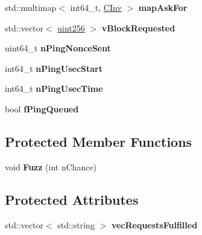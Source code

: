\begin{DoxyCompactItemize}
\item 
\mbox{\label{class_c_node_a7593dfbd76c34a81169e3fb2aa0e0cf7}} 
std\+::multimap$<$ int64\+\_\+t, \mbox{\hyperlink{class_c_inv}{C\+Inv}} $>$ {\bfseries map\+Ask\+For}
\item 
\mbox{\label{class_c_node_abeb6a27da1dc88820eb8f488c3195066}} 
std\+::vector$<$ \mbox{\hyperlink{classuint256}{uint256}} $>$ {\bfseries v\+Block\+Requested}
\item 
\mbox{\label{class_c_node_a9a077fbd09ddee1d81f027bc01a4ec68}} 
uint64\+\_\+t {\bfseries n\+Ping\+Nonce\+Sent}
\item 
\mbox{\label{class_c_node_a8352aa332af726ff117fb890c4dd3869}} 
int64\+\_\+t {\bfseries n\+Ping\+Usec\+Start}
\item 
\mbox{\label{class_c_node_ada34ffe1700a5dafb57de7c4d2491844}} 
int64\+\_\+t {\bfseries n\+Ping\+Usec\+Time}
\item 
\mbox{\label{class_c_node_aa1e9c1dc1d5cf806b9be0af155c0bf90}} 
bool {\bfseries f\+Ping\+Queued}
\end{DoxyCompactItemize}
\subsection*{Protected Member Functions}
\begin{DoxyCompactItemize}
\item 
\mbox{\label{class_c_node_a39512c4e2c788fb7a09e629b79a69e47}} 
void {\bfseries Fuzz} (int n\+Chance)
\end{DoxyCompactItemize}
\subsection*{Protected Attributes}
\begin{DoxyCompactItemize}
\item 
\mbox{\label{class_c_node_a212cf268fdb1903f61993319175f023e}} 
std\+::vector$<$ std\+::string $>$ {\bfseries vec\+Requests\+Fulfilled}
\end{DoxyCompactItemize}
